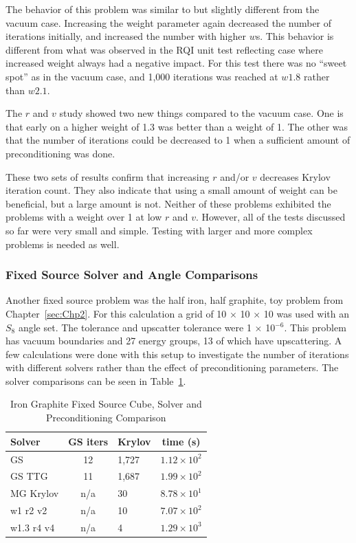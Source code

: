 The behavior of this problem was similar to but slightly different from the vacuum case. Increasing the weight parameter again decreased the number of iterations initially, and increased the number with higher $w$s. This behavior is different from what was observed in the RQI unit test reflecting case where increased weight always had a negative impact. For this test there was no ``sweet spot'' as in the vacuum case, and 1,000 iterations was reached at $w1.8$ rather than $w2.1$.

The $r$ and $v$ study showed two new things compared to the vacuum case. One is that early on a higher weight of 1.3 was better than a weight of 1. The other was that the number of iterations could be decreased to 1 when a sufficient amount of preconditioning was done. 

These two sets of results confirm that increasing $r$ and/or $v$ decreases Krylov iteration count. They also indicate that using a small amount of weight can be beneficial, but a large amount is not. Neither of these problems exhibited the problems with a weight over 1 at low $r$ and $v$. However, all of the tests discussed so far were very small and simple. Testing with larger and more complex problems is needed as well. 

\subsubsection{Fixed Source Solver and Angle Comparisons} 
Another fixed source problem was the half iron, half graphite, toy problem from Chapter~\ref{sec:Chp2}. For this calculation a grid of 10 $\times$ 10 $\times$ 10 was used with an $S_{8}$ angle set. The tolerance and upscatter tolerance were 1 $\times$ 10$^{-6}$. This problem has vacuum boundaries and 27 energy groups, 13 of which have upscattering. A few calculations were done with this setup to investigate the number of iterations with different solvers rather than the effect of preconditioning parameters. The solver comparisons can be seen in Table~\ref{table:FeC solvers}. 
%
\begin{table}[!h]
\caption{Iron Graphite Fixed Source Cube, Solver and Preconditioning Comparison}
\begin{center}
\begin{tabular}{l c l c}
\hline
Solver & GS iters & Krylov & time (s)\\[0.5ex]
\hline
GS &  12 & 1,727 & $1.12 \times 10^{2}$ \\
GS TTG & 11 & 1,687 & $1.99 \times 10^{2}$  \\
MG Krylov & n/a & 30 & $8.78 \times 10^{1}$ \\
w1 r2 v2 & n/a & 10 & $7.07 \times 10^{2}$ \\
w1.3 r4 v4 & n/a & 4 & $1.29 \times 10^{3}$ \\
\hline
\end{tabular}
\end{center}
\label{table:FeC solvers}
\end{table}

